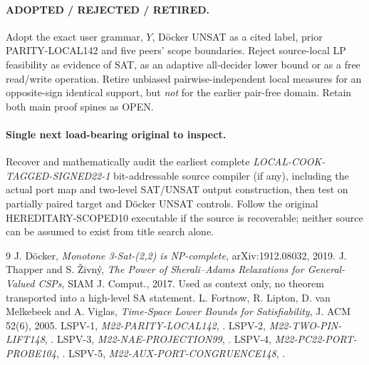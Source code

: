 \documentclass[11pt]{article}
\begin{document}
\paragraph{ADOPTED / REJECTED / RETIRED.} Adopt the exact user grammar, $Y$, D\"ocker UNSAT as a cited label, prior PARITY-LOCAL142 and five peers' scope boundaries. Reject source-local LP feasibility as evidence of SAT, as an adaptive all-decider lower bound or as a free read/write operation. Retire unbiased pairwise-independent local measures for an opposite-sign identical support, but \emph{not} for the earlier pair-free domain. Retain both main proof spines as OPEN.

\paragraph{Single next load-bearing original to inspect.} Recover and mathematically audit the earliest complete \emph{LOCAL-COOK-TAGGED-SIGNED22-1} bit-addressable source compiler (if any), including the actual port map and two-level SAT/UNSAT output construction, then test on partially paired target and D\"ocker UNSAT controls. Follow the original HEREDITARY-SCOPED10 executable if the source is recoverable; neither source can be assumed to exist from title search alone.

\begin{thebibliography}{9}
 J. D\"ocker, \emph{Monotone 3-Sat-(2,2) is NP-complete}, arXiv:1912.08032, 2019.
 J. Thapper and S. \v{Z}ivn\'y, \emph{The Power of Sherali--Adams Relaxations for General-Valued CSPs}, SIAM J. Comput., 2017. Used as context only, no theorem transported into a high-level SA statement.
 L. Fortnow, R. Lipton, D. van Melkebeek and A. Viglas, \emph{Time-Space Lower Bounds for Satisfiability}, J. ACM 52(6), 2005.
 LSPV-1, \emph{M22-PARITY-LOCAL142}, .
 LSPV-2, \emph{M22-TWO-PIN-LIFT148}, .
 LSPV-3, \emph{M22-NAE-PROJECTION99}, .
 LSPV-4, \emph{M22-PC22-PORT-PROBE104}, .
 LSPV-5, \emph{M22-AUX-PORT-CONGRUENCE148}, .
\end{thebibliography}
\end{document}
